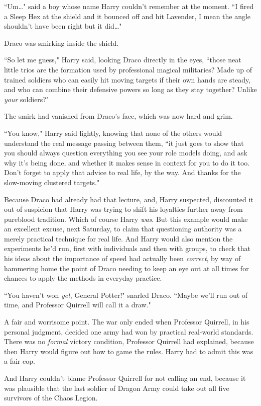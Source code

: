 ``Um{\ldots}" said a boy whose name Harry couldn't remember at the moment. ``I fired a Sleep Hex at the shield and it bounced off and hit Lavender, I mean the angle shouldn't have been right but it did{\ldots}"

Draco was smirking inside the shield.

``So let me guess," Harry said, looking Draco directly in the eyes, ``those neat little trios are the formation used by professional magical militaries? Made up of trained soldiers who can easily hit moving targets if their own hands are steady, and who can combine their defensive powers so long as they stay together? Unlike \emph{your} soldiers?"

The smirk had vanished from Draco's face, which was now hard and grim.

``You know," Harry said lightly, knowing that none of the others would understand the real message passing between them, ``it just goes to show that you should always question everything you see your role models doing, and ask why it's being done, and whether it makes sense in context for you to do it too. Don't forget to apply that advice to real life, by the way. And thanks for the slow-moving clustered targets."

Because Draco had already had that lecture, and, Harry suspected, discounted it out of suspicion that Harry was trying to shift his loyalties further away from pureblood tradition. Which of course Harry \emph{was}. But this example would make an excellent excuse, next Saturday, to claim that questioning authority was a merely practical technique for real life. And Harry would also mention the experiments he'd run, first with individuals and then with groups, to check that his ideas about the importance of speed had actually been \emph{correct}, by way of hammering home the point of Draco needing to keep an eye out at all times for chances to apply the methods in everyday practice.

``You haven't won \emph{yet}, General Potter!" snarled Draco. ``Maybe we'll run out of time, and Professor Quirrell will call it a draw."

A fair and worrisome point. The war only ended when Professor Quirrell, in his personal judgment, decided one army had won by practical real-world standards. There was no \emph{formal} victory condition, Professor Quirrell had explained, because then Harry would figure out how to game the rules. Harry had to admit this was a fair cop.

And Harry couldn't blame Professor Quirrell for not calling an end, because it was plausible that the last soldier of Dragon Army could take out all five survivors of the Chaos Legion.

